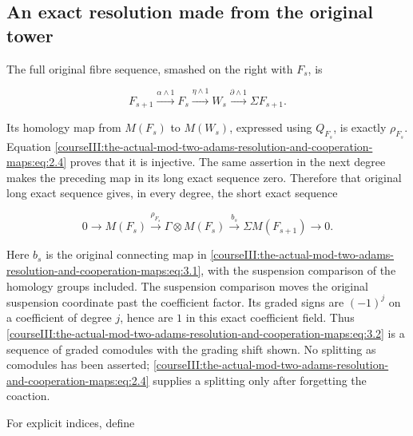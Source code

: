 \subsection{An exact resolution made from the original tower}
\label{courseIII:the-actual-mod-two-adams-resolution-and-cooperation-maps:cooperation-original-resolution}

\label{courseIII:the-actual-mod-two-adams-resolution-and-cooperation-maps:section-3}\label{courseIII:actual-resolution:3}

The full original fibre sequence, smashed on the right with \(F_s\), is

\begin{equation}
F_{s+1}\xrightarrow{\alpha\wedge1}F_s
 \xrightarrow{\eta\wedge1}W_s
 \xrightarrow{\partial\wedge1}\Sigma F_{s+1}.
 \label{courseIII:the-actual-mod-two-adams-resolution-and-cooperation-maps:eq:3.1}
\end{equation}

Its homology map from \(M(F_s)\) to \(M(W_s)\), expressed using \(Q_{F_s}\), is exactly \(\rho_{F_s}\). Equation \eqref{courseIII:the-actual-mod-two-adams-resolution-and-cooperation-maps:eq:2.4} proves that it is injective. The same assertion in the next degree makes the preceding map in its long exact sequence zero. Therefore that original long exact sequence gives, in every degree, the short exact sequence

\begin{equation}
0\longrightarrow M(F_s)
 \xrightarrow{\rho_{F_s}}\Gamma\otimes M(F_s)
 \xrightarrow{b_s}\Sigma M(F_{s+1})\longrightarrow0.
 \label{courseIII:the-actual-mod-two-adams-resolution-and-cooperation-maps:eq:3.2}
\end{equation}

Here \(b_s\) is the original connecting map in \eqref{courseIII:the-actual-mod-two-adams-resolution-and-cooperation-maps:eq:3.1}, with the suspension comparison of the homology groups included. The suspension comparison moves the original suspension coordinate past the coefficient factor. Its graded signs are \((-1)^j\) on a coefficient of degree \(j\), hence are \(1\) in this exact coefficient field. Thus \eqref{courseIII:the-actual-mod-two-adams-resolution-and-cooperation-maps:eq:3.2} is a sequence of graded comodules with the grading shift shown. No splitting as comodules has been asserted; \eqref{courseIII:the-actual-mod-two-adams-resolution-and-cooperation-maps:eq:2.4} supplies a splitting only after forgetting the coaction.

For explicit indices, define

